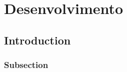 \chapter{Desenvolvimento}

\section{Introduction}

\lipsum[1-4]

\subsection{Subsection}

\lipsum[2-4]
